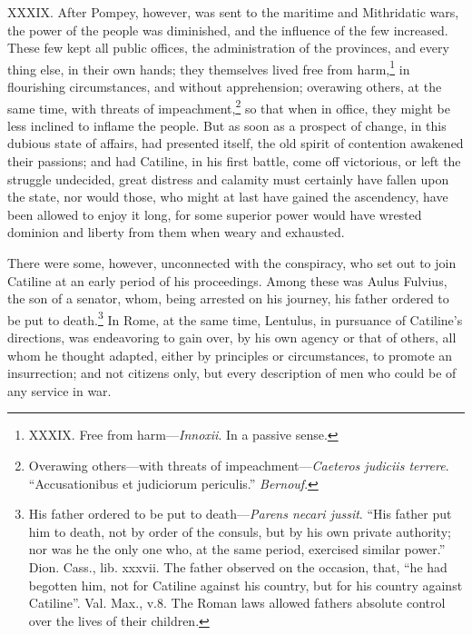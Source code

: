 XXXIX. After Pompey, however, was sent to the maritime and Mithridatic
wars, the power of the people was diminished, and the influence of the
few increased. These few kept all public offices, the administration
of the provinces, and every thing else, in their own hands; they
themselves lived free from harm,\footnote{XXXIX. Free from harm—\emph{Innoxii}. In a passive sense.} in flourishing circumstances,
and without apprehension; overawing others, at the same time, with
threats of impeachment,\footnote{Overawing others—with threats of impeachment—\emph{Caeteros
judiciis terrere}. ``Accusationibus et judiciorum periculis.''
\emph{Bernouf}.} so that when in office, they might be
less inclined to inflame the people. But as soon as a prospect of
change, in this dubious state of affairs, had presented itself, the
old spirit of contention awakened their passions; and had Catiline, in
his first battle, come off victorious, or left the struggle undecided,
great distress and calamity must certainly have fallen upon the state,
nor would those, who might at last have gained the ascendency, have
been allowed to enjoy it long, for some superior power would have
wrested dominion and liberty from them when weary and exhausted.

There were some, however, unconnected with the conspiracy, who set out
to join Catiline at an early period of his proceedings. Among these
was Aulus Fulvius, the son of a senator, whom, being arrested on his
journey, his father ordered to be put to death.\footnote{His father ordered to be put to death—\emph{Parens necari jussit}.
``His father put him to death, not by order of the consuls, but by his
own private authority; nor was he the only one who, at the same
period, exercised similar power.'' Dion. Cass., lib. xxxvii. The
father observed on the occasion, that, ``he had begotten him, not for
Catiline against his country, but for his country against Catiline''.
Val. Max., v.8. The Roman laws allowed fathers absolute control over
the lives of their children.} In Rome, at the
same time, Lentulus, in pursuance of Catiline's directions, was
endeavoring to gain over, by his own agency or that of others, all
whom he thought adapted, either by principles or circumstances, to
promote an insurrection; and not citizens only, but every description
of men who could be of any service in war.

